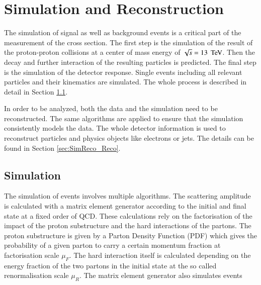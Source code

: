 
\chapter{Simulation and Reconstruction}

The simulation of signal as well as background events is a critical part of the measurement
of the \ttbar cross section. The first step is the simulation of the result of the proton-proton 
collisions at a center of mass energy of $\sqrt{s} = 13 \; \,\text{Te\hspace{-.08em}V}$. Then the decay and further interaction 
of the resulting particles is predicted. The final step is the simulation of the detector response.
Single events including all relevant particles and their kinematics are simulated.
The whole process is described in detail in Section \ref{sec:SimReco_Sim}.

In order to be analyzed, both the data and the simulation need to be reconstructed. The same algorithms are applied to ensure
that the simulation consistently models the data. 
The whole detector information is used to reconstruct particles and physics objects like electrons or jets.
The details can be found in Section \ref{sec:SimReco_Reco}. 


\section{Simulation}
\label{sec:SimReco_Sim}

The simulation of events involves multiple algorithms.
The scattering amplitude is calculated with a matrix element generator according to the initial and final state at a fixed order of QCD. These calculations rely on the factorisation of the impact of the proton substructure and the hard 
interactions of the partons. The proton substructure is given by a Parton Density Function (PDF) which gives the probability of a given parton to carry a certain momentum fraction 
at factorisation scale $\mu_F$. The hard interaction itself is calculated depending on the energy fraction of the two partons in the initial state at the so called renormalisation scale $\mu_R$.
The matrix element generator also simulates events 






